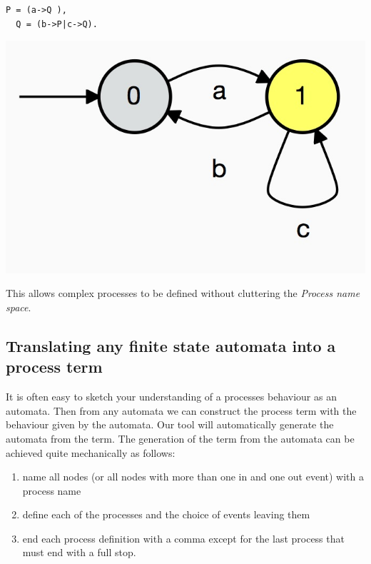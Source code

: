 \documentclass[]{article}
\begin{document}
\begin{center}\begin{minipage}{0.25\textwidth}
\begin{verbatim}
P = (a->Q ),
  Q = (b->P|c->Q).
\end{verbatim}
\end{minipage}
\begin{minipage}{0.25\textwidth}\includegraphics[scale=0.15]{P.jpg}
\end{minipage}
\end{center}
This allows complex processes to be defined without cluttering the \emph{Process name space}.

\subsection{Translating any finite state automata  into a process term}
It is often easy to   sketch  your understanding of a processes behaviour as an automata. Then from any automata  we can construct  the  process term with  the behaviour given by the automata.  Our tool  will automatically generate  the automata from the term.  The generation of the term from the automata  can be achieved quite mechanically as follows:

\begin{enumerate}
\item name all nodes (or all nodes with more than one in and one out event) with a process name
\item define each of the processes and the choice of events leaving them
\item end each process definition with a comma except for the last process that must end with a full stop.
\end{enumerate}
\end{document}
